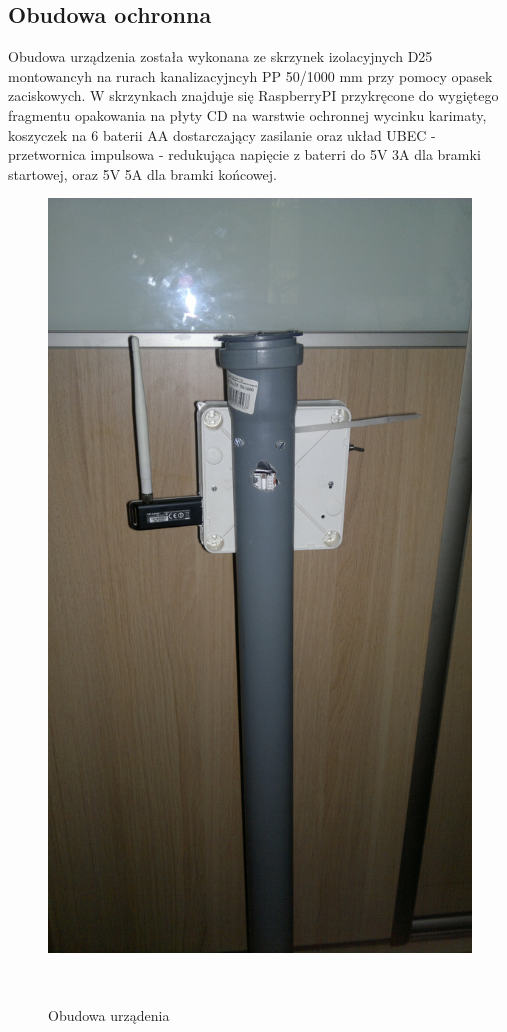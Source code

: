 \documentclass[11pt,a4paper, twoside]{article}
\begin{document}
\subsection{Obudowa ochronna}
Obudowa urządzenia została wykonana ze skrzynek izolacyjnych D25 montowancyh na rurach kanalizacyjncyh PP 50/1000 mm przy pomocy opasek zaciskowych. W skrzynkach znajduje się RaspberryPI przykręcone do wygiętego fragmentu opakowania na płyty CD na warstwie ochronnej wycinku karimaty, koszyczek na 6 baterii AA dostarczający zasilanie oraz układ UBEC - przetwornica impulsowa - redukująca napięcie z baterri do 5V 3A dla bramki startowej, oraz 5V 5A dla bramki końcowej. 

\begin{figure}[H]
\begin{center}
\includegraphics[scale=0.10]{./img/device.jpg}
\caption{Obudowa urządenia}
$\label{device}$
\end{center}
\end{figure}
\fi
\end{document}

